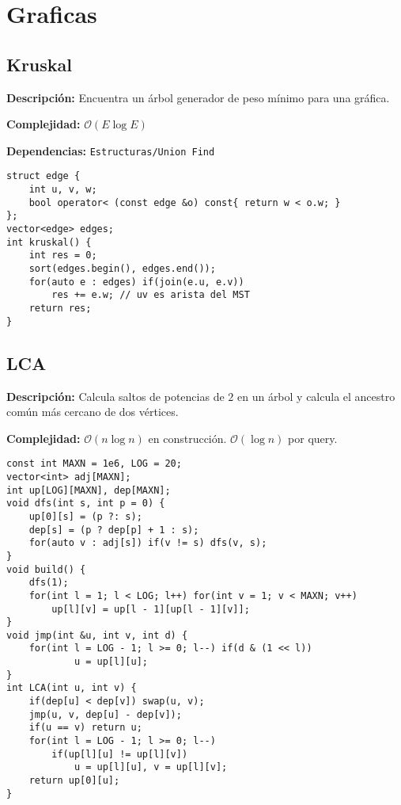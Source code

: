 \documentclass[twocolumn]{article}
\begin{document}
\setlength{\parindent=0pt}
\section{Graficas}
\subsection{Kruskal}
\begin{footnotesize}{\bf Descripción:} Encuentra un árbol generador de peso mínimo para una gráfica.


{\bf Complejidad:} $\mathcal{O}(E \log E)$


{\bf Dependencias:} \texttt{Estructuras/Union Find}
\end{footnotesize}\lstset{basicstyle=\footnotesize\ttfamily,breaklines=true,tabsize=2,language=C++,frame=leftline, numbers=left, numberstyle=\tiny, numbersep=5pt}
\begin{lstlisting}
struct edge {
	int u, v, w;
	bool operator< (const edge &o) const{ return w < o.w; }
};
vector<edge> edges;
int kruskal() {
	int res = 0;
	sort(edges.begin(), edges.end());
	for(auto e : edges) if(join(e.u, e.v))
		res += e.w; // uv es arista del MST
	return res;
}
\end{lstlisting}
\subsection{LCA}
\begin{footnotesize}{\bf Descripción: } Calcula saltos de potencias de $2$ en un árbol y calcula el ancestro común más cercano de dos vértices.


{\bf Complejidad: } $\mathcal{O}(n \log n)$ en construcción. $\mathcal{O}(\log n)$ por query.
\end{footnotesize}\lstset{basicstyle=\footnotesize\ttfamily,breaklines=true,tabsize=2,language=C++,frame=leftline, numbers=left, numberstyle=\tiny, numbersep=5pt}
\begin{lstlisting}
const int MAXN = 1e6, LOG = 20;
vector<int> adj[MAXN];
int up[LOG][MAXN], dep[MAXN];
void dfs(int s, int p = 0) {
	up[0][s] = (p ?: s);
	dep[s] = (p ? dep[p] + 1 : s);
	for(auto v : adj[s]) if(v != s) dfs(v, s);
}
void build() {
	dfs(1);
	for(int l = 1; l < LOG; l++) for(int v = 1; v < MAXN; v++)
		up[l][v] = up[l - 1][up[l - 1][v]];
}
void jmp(int &u, int v, int d) {
	for(int l = LOG - 1; l >= 0; l--) if(d & (1 << l))
			u = up[l][u];
}
int LCA(int u, int v) {
	if(dep[u] < dep[v]) swap(u, v);
	jmp(u, v, dep[u] - dep[v]);
	if(u == v) return u;
	for(int l = LOG - 1; l >= 0; l--)
		if(up[l][u] != up[l][v])
			u = up[l][u], v = up[l][v];
	return up[0][u];
}
\end{lstlisting}
\end{document}
